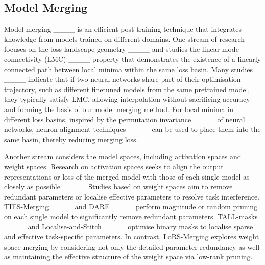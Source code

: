 \subsection{Model Merging}
Model merging ____ is an efficient post-training technique that integrates knowledge from models trained on different domains.
One stream of research focuses on the loss landscape geometry ____ and studies the linear mode connectivity (LMC) ____ property that demonstrates the existence of a linearly connected path between local minima within the same loss basin.
Many studies ____ indicate that if two neural networks share part of their optimisation trajectory, such as different finetuned models from the same pretrained model, they typically satisfy LMC, allowing interpolation without sacrificing accuracy and forming the basis of our model merging method. 
For local minima in different loss basins, inspired by the permutation invariance ____ of neural networks, neuron alignment techniques ____ can be used to place them into the same basin, thereby reducing merging loss.

Another stream considers the model spaces, including activation spaces and weight spaces.
Research on activation spaces seeks to align the output representations or loss of the merged model with those of each single model as closely as possible ____. Studies based on weight spaces aim to remove redundant parameters or localise effective parameters to resolve task interference.
TIES-Merging ____ and DARE ____ perform magnitude or random pruning on each single model to significantly remove redundant parameters.
TALL-masks ____ and Localise-and-Stitch ____ optimise binary masks to localise sparse and effective task-specific parameters. In contrast, LoRS-Merging explores weight space merging by considering not only the detailed parameter redundancy as well as maintaining the effective structure of the weight space via low-rank pruning.
